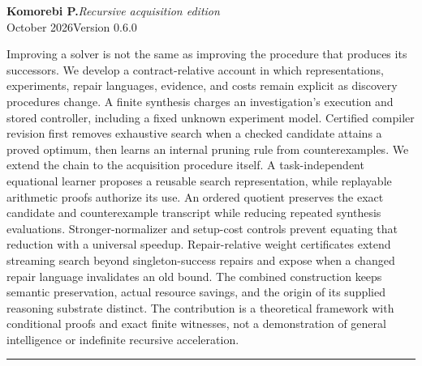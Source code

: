 \documentclass[11pt,letterpaper]{article}
\theoremstyle{plain}
\theoremstyle{definition}
\begin{document}
\hypersetup{pageanchor=false}
\begin{titlepage}\thispagestyle{empty}
\vspace*{.25in}
\par
\vspace{.65in}
\vspace{.19in}
\vspace{.27in}\noindent{\color{ink}\rule{\textwidth}{.85pt}}\par
\vspace{.16in}
\noindent\textbf{Komorebi P.}\hfill\textit{Recursive acquisition edition}\\
 October 2026\hfill Version 0.6.0\par
\vspace{.38in}
\par\smallskip
\noindent Improving a solver is not the same as improving the procedure that produces its successors. We develop a contract-relative account in which representations, experiments, repair languages, evidence, and costs remain explicit as discovery procedures change. A finite synthesis charges an investigation's execution and stored controller, including a fixed unknown experiment model. Certified compiler revision first removes exhaustive search when a checked candidate attains a proved optimum, then learns an internal pruning rule from counterexamples. We extend the chain to the acquisition procedure itself. A task-independent equational learner proposes a reusable search representation, while replayable arithmetic proofs authorize its use. An ordered quotient preserves the exact candidate and counterexample transcript while reducing repeated synthesis evaluations. Stronger-normalizer and setup-cost controls prevent equating that reduction with a universal speedup. Repair-relative weight certificates extend streaming search beyond singleton-success repairs and expose when a changed repair language invalidates an old bound. The combined construction keeps semantic preservation, actual resource savings, and the origin of its supplied reasoning substrate distinct. The contribution is a theoretical framework with conditional proofs and exact finite witnesses, not a demonstration of general intelligence or indefinite recursive acceleration.
\vfill\noindent\rule{\textwidth}{.4pt}\par\smallskip
{}
\end{titlepage}
\hypersetup{pageanchor=true}
\begingroup\small\setlength{\parskip}{0pt}\tableofcontents\endgroup\clearpage
\end{document}
